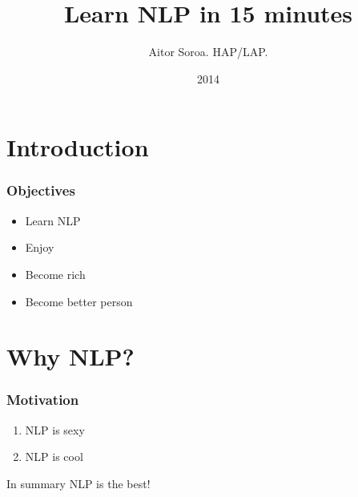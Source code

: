 \documentclass{beamer}
\title{Learn NLP in 15 minutes}
\author{Aitor Soroa. HAP/LAP.}
\date{2014}
\begin{document}
\begin{frame}[plain]
  \titlepage
\end{frame}

\begin{frame}
  \tableofcontents
\end{frame}

\section{Introduction}
\label{sec:introduction}

\begin{frame}
  \frametitle{Objectives}
  \begin{itemize}
  \item Learn NLP
  \item Enjoy
  \item Become rich
  \item Become better person
  \end{itemize}
\end{frame}

\section{Why NLP?}
\label{sec:why-nlp}

\begin{frame}
  \frametitle{Motivation}
  \begin{enumerate}
  \item NLP is sexy
  \item NLP is cool
  \end{enumerate}
  \begin{block}{In summary}
    NLP is the best!
  \end{block}
\end{frame}
\end{document}
